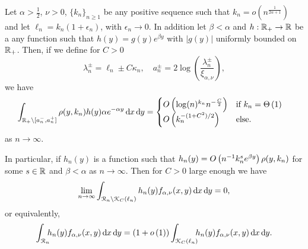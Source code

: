 \begin{lemma}\label{lem:concentration_argument}
Let $\alpha > \frac{1}{2}$, $\nu > 0$, $\{k_n\}_{n \ge 1}$ be any positive sequence such that $k_n = o(n^{\frac{1}{2\alpha + 1}})$ and let $\ell_n = k_n(1 + \epsilon_n)$, with $\epsilon_n \to 0$. In addition let $\beta < \alpha$ and $h : {\mathbb R}_+ \rightarrow  {\ensuremath{\mathbb R}}$ be a any function such that $h(y) = g(y)e^{\beta y}$ with $|g(y)|$ uniformly bounded on ${\mathbb R}_+$. Then, if we define for $C > 0$
\[
	\lambda_n^\pm = \ell_n \pm C \kappa_n, 
	\quad a_n^\pm = 2 \log\left(\frac{\lambda_n^\pm}{\xi_{\alpha,\nu}}\right),
\] 
we have
\begin{equation}\label{eq:error_bound_int_rho_not_K}
\begin{aligned}
	\int_{{\mathbb R}_+ \setminus [a_n^-, a_n^+]} \rho(y,k_n) h(y) \alpha e^{-\alpha y} \operatorname{\mathrm{d}\hspace{-2pt}} x \operatorname{\mathrm{d}\hspace{-2pt}} y
	&= \begin{cases}
		O\left(\log(n)^{k_n} n^{-\frac{C}{2}}\right) &\mbox{if } k_n = \Theta\left(1\right) \\
		O\left(k_n^{-(1+C^2)/2}\right) &\mbox{else.}
	\end{cases}
\end{aligned}
\end{equation}
as $n \to \infty$. 

In particular, if $h_n(y)$ is a function such that $h_n(y) = O\left(n^{-1} k_n^{s} e^{\beta y}\right)\rho(y,k_n)$ for some $s \in {\ensuremath{\mathbb R}}$ and $\beta < \alpha$ as $n \to \infty$. Then for $C > 0$ large enough we have
\[
	\lim_{n \to \infty} \int_{{\mathcal R}_n \setminus {\mathcal K}_{C}(\ell_n)} h_n(y) f_{\alpha,\nu}(x,y) \operatorname{\mathrm{d}\hspace{-2pt}} x\operatorname{\mathrm{d}\hspace{-2pt}} y = 0,
\]
or equivalently,
\[
	\int_{{\mathcal R}_n} \hspace{-5pt} h_n(y) f_{\alpha,\nu}(x,y) \operatorname{\mathrm{d}\hspace{-2pt}} x \operatorname{\mathrm{d}\hspace{-2pt}} y
	= (1+o\left(1\right)) \int_{{\mathcal K}_{C}(\ell_n)} \hspace{-5pt} h_n(y) f_{\alpha,\nu}(x,y) \operatorname{\mathrm{d}\hspace{-2pt}} x \operatorname{\mathrm{d}\hspace{-2pt}} y.
\]
\end{lemma}

